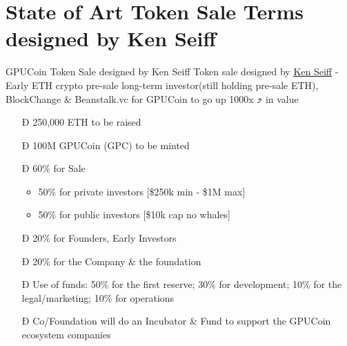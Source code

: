 \documentclass[10pt,handout]{beamer}
\begin{document}
\section{State of Art Token Sale Terms designed by Ken Seiff}
\begin{frame}[fragile]{GPUCoin Token Sale designed by Ken Seiff}
Token sale designed by \href{https://beanstalk.vc/}{\underline{Ken Seiff}} - Early ETH crypto pre-sale long-term investor(still holding pre-sale ETH), BlockChange \& Beanstalk.vc for GPUCoin to go up 1000x ⤴ in value


 \begin{itemize}[<+-| alert@+>]%

\item[Ð]{250,000 ETH to be raised}
\item[Ð]100M GPUCoin (GPC) to be minted
\item[Ð]60\% for Sale
\begin{itemize}[<+-| alert@+>]
\item 50\% for private investors [\$250k min - \$1M max]
\item 50\% for public investors [\$10k cap no whales]
\end{itemize}
\item[Ð]{20\% for Founders, Early Investors}
\item[Ð]{20\% for the Company \& the foundation}
\item[Ð]{Use of funds: 50\% for the first reserve; 30\% for development; 10\% for the legal/marketing; 10\% for operations}
\item[Ð]{Co/Foundation will do an Incubator \& Fund to support the GPUCoin ecosystem companies}
\end{itemize}

\end{frame}
\end{document}
